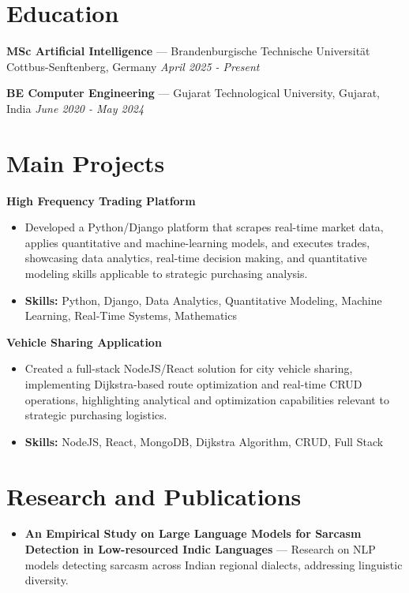 \documentclass[a4paper,10pt]{article}
\begin{document}
\section*{Education}
\textbf{MSc Artificial Intelligence} — Brandenburgische Technische Universität Cottbus-Senftenberg, Germany \hfill \textit{April 2025 - Present}\par
\vspace{1.5pt}
\textbf{BE Computer Engineering} — Gujarat Technological University, Gujarat, India \hfill \textit{June 2020 - May 2024}\par

\section*{Main Projects}
\textbf{High Frequency Trading Platform}\par
\vspace{1pt}
\begin{itemize}
  \item Developed a Python/Django platform that scrapes real-time market data, applies quantitative and machine-learning models, and executes trades, showcasing data analytics, real-time decision making, and quantitative modeling skills applicable to strategic purchasing analysis.
  \item \textbf{Skills:} Python, Django, Data Analytics, Quantitative Modeling, Machine Learning, Real-Time Systems, Mathematics
\end{itemize}
\vspace{3pt}
\textbf{Vehicle Sharing Application}\par
\vspace{1pt}
\begin{itemize}
  \item Created a full-stack NodeJS/React solution for city vehicle sharing, implementing Dijkstra-based route optimization and real-time CRUD operations, highlighting analytical and optimization capabilities relevant to strategic purchasing logistics.
  \item \textbf{Skills:} NodeJS, React, MongoDB, Dijkstra Algorithm, CRUD, Full Stack
\end{itemize}

\section*{Research and Publications}
\begin{itemize}
\item \textbf{An Empirical Study on Large Language Models for Sarcasm Detection in Low-resourced Indic Languages} — Research on NLP models detecting sarcasm across Indian regional dialects, addressing linguistic diversity.
\end{itemize}
\end{document}
